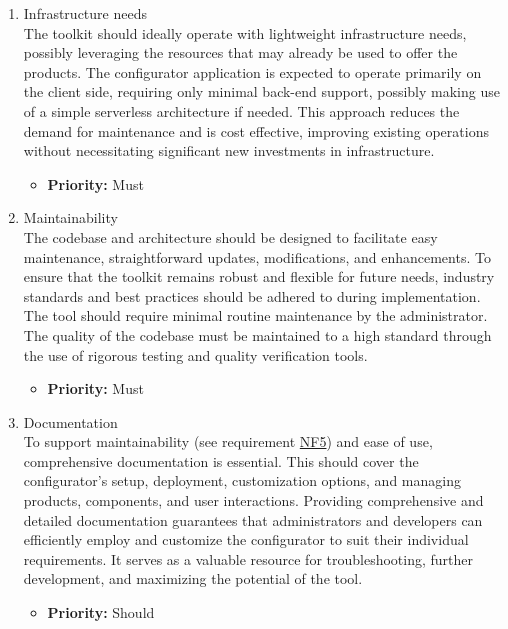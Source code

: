 \begin{enumerate}[label=\textbf{NF\arabic*:}, leftmargin=*]
\item \label{itm:NF4} Infrastructure needs
\vspace{2pt}
\\The toolkit should ideally operate with lightweight infrastructure needs, possibly leveraging the resources that may already be used to offer the products. The configurator application is expected to operate primarily on the client side, requiring only minimal back-end support, possibly making use of a simple serverless architecture if needed. This approach reduces the demand for maintenance and is cost effective, improving existing operations without necessitating significant new investments in infrastructure.
\begin{itemize}[noitemsep, label=\trianglebullet]
    \item \textbf{Priority:} Must
\end{itemize}
\vspace{4pt}

\item \label{itm:NF5} Maintainability
\vspace{2pt}
\\The codebase and architecture should be designed to facilitate easy maintenance, straightforward updates, modifications, and enhancements. To ensure that the toolkit remains robust and flexible for future needs, industry standards and best practices should be adhered to during implementation. The tool should require minimal routine maintenance by the administrator. The quality of the codebase must be maintained to a high standard through the use of rigorous testing and quality verification tools.
\begin{itemize}[noitemsep, label=\trianglebullet]
    \item \textbf{Priority:} Must
\end{itemize}
\vspace{4pt}

\item Documentation
\vspace{2pt}
\\To support maintainability (see requirement \hyperref[itm:NF5]{NF5}) and ease of use, comprehensive documentation is essential. This should cover the configurator's setup, deployment, customization options, and managing products, components, and user interactions. Providing comprehensive and detailed documentation guarantees that administrators and developers can efficiently employ and customize the configurator to suit their individual requirements. It serves as a valuable resource for troubleshooting, further development, and maximizing the potential of the tool.
\begin{itemize}[noitemsep, label=\trianglebullet]
    \item \textbf{Priority:} Should
\end{itemize}
\vspace{4pt}


\end{enumerate}
